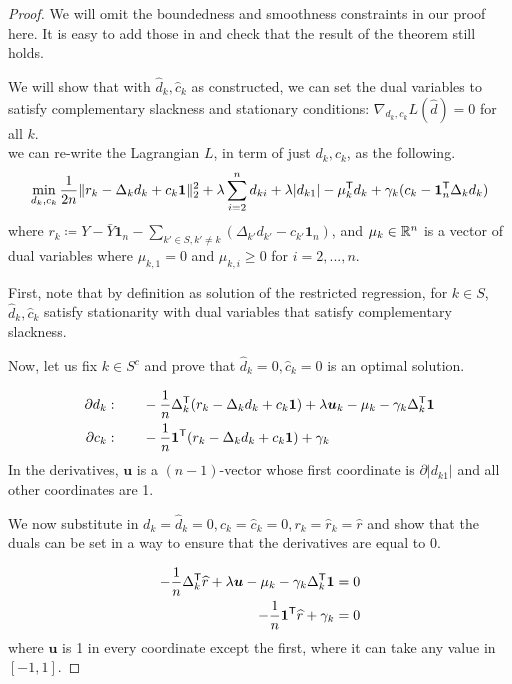 \begin{proof}
We will omit the boundedness and smoothness constraints in our proof here. It is easy to add those in and check that the result of the theorem still holds.

We will show that with $\hat{d}_k, \hat{c}_k$ as constructed, we can set the dual variables to satisfy complementary slackness and stationary conditions: $\nabla_{d_k, c_k} L(\hat{d})  = 0$ for all $k$.\\ 

we can re-write the Lagrangian $L$, in term of just $d_k,c_k$, as the following.
\[
\min_{d_k, c_k}  \frac{1}{2n} \| r_k - \Delta_k d_k + c_k \mbox{\boldmath $1$} \|_2^2 
        + \lambda \sum_{i=2}^n d_{ki} + \lambda|d_{k1}| 
        - \mu_k^{\mathsf{T}} d_k + \gamma_k (c_k - \mbox{\boldmath $1$}_n^{\mathsf{T}}\Delta_k d_k)
\]
where $r_k \coloneqq Y - \bar{Y}\mathbf{1}_n - \sum_{k' \in S, k' \neq k} (\Delta_{k'} d_{k'} - c_{k'} \mathbf{1}_n) $, and $\mu_k \in {\mathbb R}^n$ is a vector of dual variables where $\mu_{k,1} = 0$ and $\mu_{k,i} \geq 0$ for $i=2,...,n$.

First, note that by definition as solution of the restricted regression, for $k \in S$, $\hat{d}_k, \hat{c}_k$ satisfy stationarity with dual variables that satisfy complementary slackness. 

Now, let us fix $k \in S^c$ and prove that $\hat{d}_k = 0, \hat{c}_k=0$ is an optimal solution. 

\begin{align*}
\partial d_k :& \qquad -\frac{1}{n} \Delta_k^{\mathsf{T}} ( r_k - \Delta_k d_k 
       + c_k \mbox{\boldmath $1$}) + \lambda \mbox{\boldmath $u$}_k  - \mu_k - \gamma_k \Delta_k^{\mathsf{T}} \mbox{\boldmath $1$} \\
\partial c_k: & \qquad -\frac{1}{n} \mbox{\boldmath $1$}^{\mathsf{T}} ( r_k - \Delta_k d_k 
       + c_k \mbox{\boldmath $1$}) + \gamma_k
\end{align*}
In the derivatives, $\mathbf{u}$ is a $(n-1)$-vector whose first coordinate is $\partial | d_{k1}|$ and all other coordinates are 1.

We now substitute in $d_k = \hat{d}_k = 0, c_k=\hat{c}_k=0, r_k = \hat{r}_k = \hat{r}$ and show that the duals can be set in a way to ensure that the derivatives are equal to 0.

\begin{align*}
-\frac{1}{n} \Delta_k^{\mathsf{T}}\widehat{r} + \lambda \mbox{\boldmath $u$} 
           - \mu_k - \gamma_k \Delta_k^{\mathsf{T}} \mbox{\boldmath $1$} &= 0 \\
-\frac{1}{n} \mbox{\boldmath $1$}^{\mathsf{T}} \widehat{r} + \gamma_k & = 0 \\
\end{align*}
where $\mathbf{u}$ is 1 in every coordinate except the first, where it can take any value in $[-1,1]$.


\end{proof}
